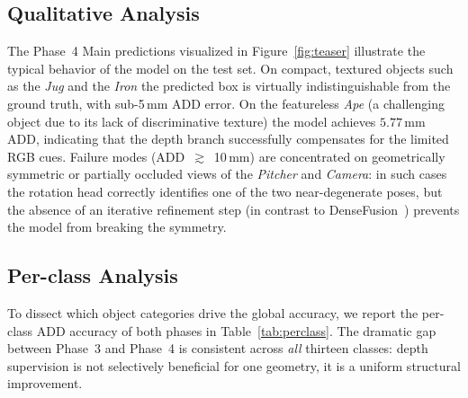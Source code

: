 \subsection{Qualitative Analysis}
\label{sec:exp_qualitative}

The Phase~4 Main predictions visualized in Figure~\ref{fig:teaser} illustrate the typical behavior of the model on the test set. On compact, textured objects such as the \textit{Jug} and the \textit{Iron} the predicted box is virtually indistinguishable from the ground truth, with sub-5\,mm ADD error. On the featureless \textit{Ape} (a challenging object due to its lack of discriminative texture) the model achieves $5.77$\,mm ADD, indicating that the depth branch successfully compensates for the limited RGB cues. Failure modes (ADD~$\gtrsim$~10\,mm) are concentrated on geometrically symmetric or partially occluded views of the \textit{Pitcher} and \textit{Camera}: in such cases the rotation head correctly identifies one of the two near-degenerate poses, but the absence of an iterative refinement step (in contrast to DenseFusion~\cite{wang2019densefusion}) prevents the model from breaking the symmetry.

\subsection{Per-class Analysis}
\label{sec:exp_perclass}

To dissect which object categories drive the global accuracy, we report the per-class ADD accuracy of both phases in Table~\ref{tab:perclass}. The dramatic gap between Phase~3 and Phase~4 is consistent across \emph{all} thirteen classes: depth supervision is not selectively beneficial for one geometry, it is a uniform structural improvement.

